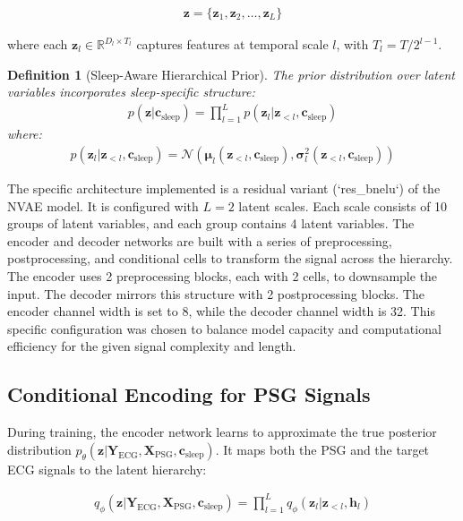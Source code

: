 \documentclass[10pt, conference]{IEEEtran}
\newtheorem{definition}{Definition}
\begin{document}
\begin{align}
\mathbf{z} = \{\mathbf{z}_1, \mathbf{z}_2, \ldots, \mathbf{z}_L\}
\end{align}

where each $\mathbf{z}_l \in \mathbb{R}^{D_l \times T_l}$ captures features at temporal scale $l$, with $T_l = T / 2^{l-1}$.

\begin{definition}[Sleep-Aware Hierarchical Prior]
The prior distribution over latent variables incorporates sleep-specific structure:
\begin{align}
p(\mathbf{z} | \mathbf{c}_{\text{sleep}}) = \prod_{l=1}^L p(\mathbf{z}_l | \mathbf{z}_{<l}, \mathbf{c}_{\text{sleep}})
\end{align}
where:
\begin{align}
p(\mathbf{z}_l | \mathbf{z}_{<l}, \mathbf{c}_{\text{sleep}}) = \mathcal{N}(\boldsymbol{\mu}_l(\mathbf{z}_{<l}, \mathbf{c}_{\text{sleep}}), \boldsymbol{\sigma}_l^2(\mathbf{z}_{<l}, \mathbf{c}_{\text{sleep}}))
\end{align}
\end{definition}

The specific architecture implemented is a residual variant (`res_bnelu`) of the NVAE model. It is configured with $L=2$ latent scales. Each scale consists of 10 groups of latent variables, and each group contains 4 latent variables. The encoder and decoder networks are built with a series of preprocessing, postprocessing, and conditional cells to transform the signal across the hierarchy. The encoder uses 2 preprocessing blocks, each with 2 cells, to downsample the input. The decoder mirrors this structure with 2 postprocessing blocks. The encoder channel width is set to 8, while the decoder channel width is 32. This specific configuration was chosen to balance model capacity and computational efficiency for the given signal complexity and length.

\subsection{Conditional Encoding for PSG Signals}

During training, the encoder network learns to approximate the true posterior distribution $p_\theta(\mathbf{z} | \mathbf{Y}_{\text{ECG}}, \mathbf{X}_{\text{PSG}}, \mathbf{c}_{\text{sleep}})$. It maps both the PSG and the target ECG signals to the latent hierarchy:

\begin{align}
q_\phi(\mathbf{z} | \mathbf{Y}_{\text{ECG}}, \mathbf{X}_{\text{PSG}}, \mathbf{c}_{\text{sleep}}) = \prod_{l=1}^L q_\phi(\mathbf{z}_l | \mathbf{z}_{<l}, \mathbf{h}_l)
\end{align}
\end{document}
